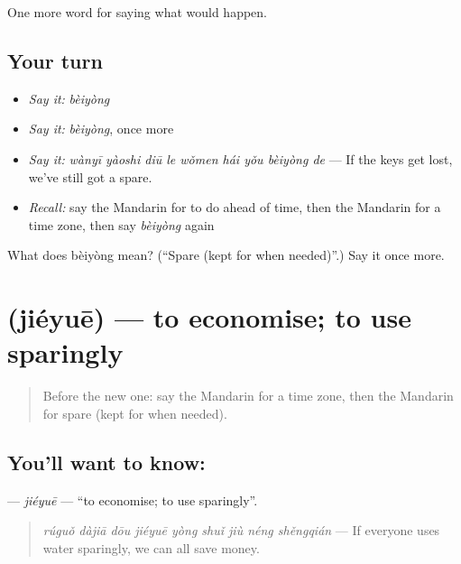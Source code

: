 \begin{grammarlens}[title={What you've built}]
One more word for saying what would happen.
\end{grammarlens}

\subsection*{Your turn}
\begin{itemize}
\raggedright
  \item \emph{Say it:} \emph{bèiyòng}
  \item \emph{Say it:} \emph{bèiyòng}, once more
  \item \emph{Say it:} \emph{wànyī yàoshi diū le wǒmen hái yǒu bèiyòng de} — If the keys get lost, we've still got a spare.
  \item \emph{Recall:} say the Mandarin for to do ahead of time, then the Mandarin for a time zone, then say \emph{bèiyòng} again
\end{itemize}

\begin{tcolorbox}[breakable,colback=teal!4,colframe=teal!35!black,title={Before you move on}]
What does bèiyòng mean? (\textquotedblleft{}Spare (kept for when needed)\textquotedblright{}.) Say it once more.
\end{tcolorbox}
\section[\texorpdfstring{\zh{节约} (jiéyuē)}{节约 (jiéyuē)}]{ (jiéyuē) — to economise; to use sparingly}

\label{lesson:ZH-C389-jieyue}



\begin{quote}
Before the new one: say the Mandarin for a time zone, then the Mandarin for spare (kept for when needed).
\end{quote}

\subsection*{You'll want to know: }
\textbf{} — \emph{jiéyuē} — \textquotedblleft{}to economise; to use sparingly\textquotedblright{}.

\begin{quote}
\emph{rúguǒ dàjiā dōu jiéyuē yòng shuǐ jiù néng shěngqián} — If everyone uses water sparingly, we can all save money.
\end{quote}

